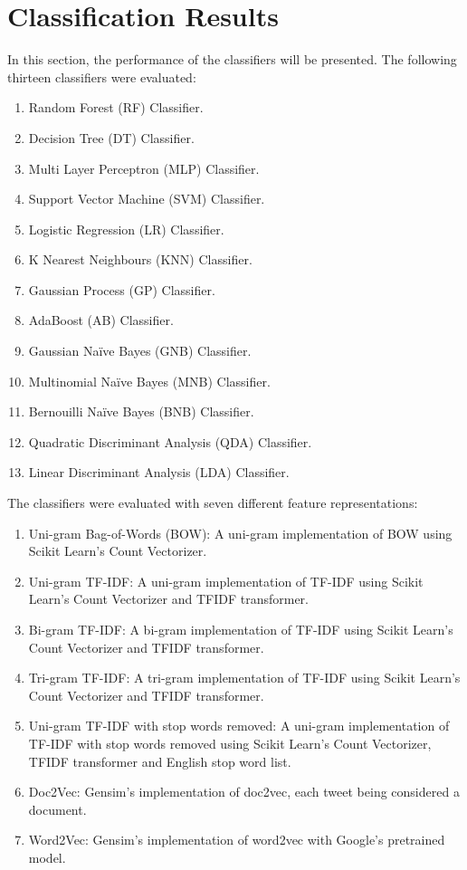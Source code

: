\section{Classification Results}

In this section, the performance of the classifiers will be presented. The following thirteen classifiers were evaluated:
\begin{enumerate}
    \item Random Forest (RF) Classifier.
    \item Decision Tree (DT) Classifier.
    \item Multi Layer Perceptron (MLP) Classifier.
    \item Support Vector Machine (SVM) Classifier.
    \item Logistic Regression (LR) Classifier.
    \item K Nearest Neighbours (KNN) Classifier.
    \item Gaussian Process (GP) Classifier.
    \item AdaBoost (AB) Classifier.
    \item Gaussian Naïve Bayes (GNB) Classifier.
    \item Multinomial Naïve Bayes (MNB) Classifier.
    \item Bernouilli Naïve Bayes (BNB) Classifier.
    \item Quadratic Discriminant Analysis (QDA) Classifier.
    \item Linear Discriminant Analysis (LDA) Classifier.
\end{enumerate}

The classifiers were evaluated with seven different feature representations:
\begin{enumerate}
    \item Uni-gram Bag-of-Words (BOW): A uni-gram implementation of BOW using Scikit Learn's Count Vectorizer.
    \item Uni-gram TF-IDF: A uni-gram implementation of TF-IDF using Scikit Learn's Count Vectorizer and TFIDF transformer.
    \item Bi-gram TF-IDF: A bi-gram implementation of TF-IDF using Scikit Learn's Count Vectorizer and TFIDF transformer.
    \item Tri-gram TF-IDF: A tri-gram implementation of TF-IDF using Scikit Learn's Count Vectorizer and TFIDF transformer.
    \item Uni-gram TF-IDF with stop words removed: A uni-gram implementation of TF-IDF with stop words removed using Scikit Learn's Count Vectorizer, TFIDF transformer and English stop word list.
    \item Doc2Vec: Gensim's implementation of doc2vec, each tweet being considered a document.
    \item Word2Vec: Gensim's implementation of word2vec with Google's pretrained model.
\end{enumerate}

